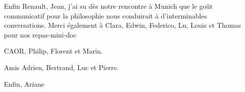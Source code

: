 \begin{acknowledgements}
Enfin Renault, Jean, j'ai su dès notre rencontre à Munich que le goût communicatif pour la philosophie nous conduirait à d'interminables conversations. 
Merci également à Clara, Edwin, Federico, Lu, Louis et Thomas pour nos repas-mini-doc

CAOR, Philip, Florent et Marin.

Amis Adrien, Bertrand, Luc et Pierre.

Enfin, Ariane

\end{acknowledgements}


